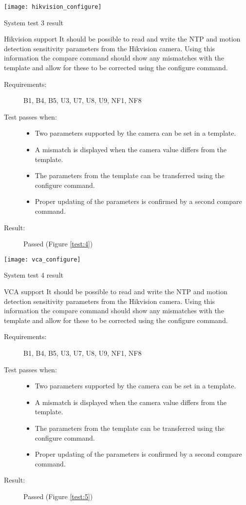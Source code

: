 \begin{marginfigure}
	\texttt{[image: hikvision\_configure]}
	\caption{System test 3 result}
	\label{test:4}
\end{marginfigure}

\begin{test}[label={test_hikvision}]{Hikvision support}
It should be possible to read and write the NTP and motion detection sensitivity parameters from the Hikvision camera.
Using this information the compare command should show any mismatches with the template and allow for these to be corrected using the configure command.
\tcbline
	\begin{description}
		\item[Requirements:] B1, B4, B5, U3, U7, U8, U9, NF1, NF8
		\item[Test passes when:] \hfill
			\begin{itemize}
				\item Two parameters supported by the camera can be set in a template.
				\item A mismatch is displayed when the camera value differs from the template.
				\item The parameters from the template can be transferred using the configure command.
				\item Proper updating of the parameters is confirmed by a second compare command.
			\end{itemize}
		\item[Result:] Passed (Figure \ref{test:4})
	\end{description}
\end{test}

\begin{marginfigure}
	\texttt{[image: vca\_configure]}
	\caption{System test 4 result}
	\label{test:5}
\end{marginfigure}

\begin{test}[label={test_vca}]{VCA support}
It should be possible to read and write the NTP and motion detection sensitivity parameters from the Hikvision camera.
Using this information the compare command should show any mismatches with the template and allow for these to be corrected using the configure command.
\tcbline
	\begin{description}
		\item[Requirements:] B1, B4, B5, U3, U7, U8, U9, NF1, NF8
		\item[Test passes when:] \hfill
			\begin{itemize}
				\item Two parameters supported by the camera can be set in a template.
				\item A mismatch is displayed when the camera value differs from the template.
				\item The parameters from the template can be transferred using the configure command.
				\item Proper updating of the parameters is confirmed by a second compare command.
			\end{itemize}
		\item[Result:] Passed (Figure \ref{test:5})
	\end{description}
\end{test}

